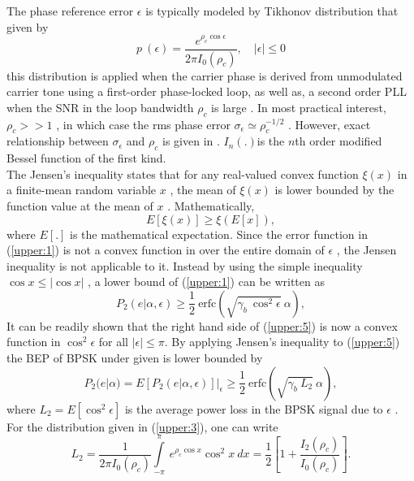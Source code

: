 The phase reference error $\epsilon$  is typically modeled by
Tikhonov distribution that given by \cite{viterbi:1966}
\begin{equation}
\label{upper:3} p~(\epsilon)=\frac{e^{\rho_{c}\cos\epsilon}}{2\pi
I_{0}(\rho_c)}, \quad |\epsilon| \le 0
\end{equation}
this distribution is applied when the carrier phase is derived
from unmodulated carrier tone using a first-order phase-locked
loop, as well as, a second order PLL when the SNR in the loop
bandwidth $\rho_c$  is large \cite{viterbi:1966}. In most
practical interest, $\rho_c>>1$ , in which case the rms phase
error $\sigma_\epsilon\simeq\rho_c^{-1/2}$ . However, exact
relationship between $\sigma_\epsilon$ and $\rho_c$ is given in
\cite{viterbi:1966} . $I_n(.)$is the $n$th  order modified Bessel
function of the first kind.\\

The Jensen's inequality states that for any real-valued convex
function $\xi(x)$  in a finite-mean random variable $x$  , the
mean of  $\xi(x)$ is lower bounded by the function value at the
mean of $x$ \cite{viterbi:1966} . Mathematically,
\begin{equation}
\label{upper:4} E\left[\xi(x)\right] \ge\xi \left(E[x]\right),
\end{equation}
where $E[.]$  is the mathematical expectation. Since the error
function in (\ref{upper:1}) is not a convex function in  over the
entire domain of $\epsilon$ , the Jensen inequality is not
applicable to it. Instead by using the simple inequality $\cos x
\le|\cos x|$ , a lower bound of (\ref{upper:1}) can be written as
\begin{equation}
\label{upper:5}
P_2(e|\alpha,\epsilon)\ge\frac{1}{2}~\mbox{erfc}\left(\sqrt{\gamma_b~
\cos^2{\epsilon}}~\alpha\right),
\end{equation}
It can be readily shown that the right hand side of
(\ref{upper:5}) is now a convex function in $\cos^2\epsilon$  for
all $|\epsilon|\le\pi$. By applying Jensen's inequality to
(\ref{upper:5}) the BEP of BPSK under given is lower bounded by
\begin{equation}
\label{upper:6}
P_2(e|\alpha)=E\left[P_2(e|\alpha,\epsilon)\right]|_\epsilon \ge
\frac{1}{2}~\mbox{erfc}\left(\sqrt{\gamma_b~L_2}~\alpha\right),
\end{equation}
where $L_2= E[\cos^2\epsilon]$  is the average power loss in the
BPSK signal due to $\epsilon$ . For the distribution given in
(\ref{upper:3}), one can write
\begin{equation}
\label{upper:7} L_2=\frac{1}{2\pi
I_{0}(\rho_c)}\int\limits_{-\pi}^{\pi}~e^{\rho_c \cos x} \cos
^2x~dx =\frac{1}{2}\left[1+\frac{I_2(\rho_c)}{I_0(\rho_c)}\right].
\end{equation}\\

